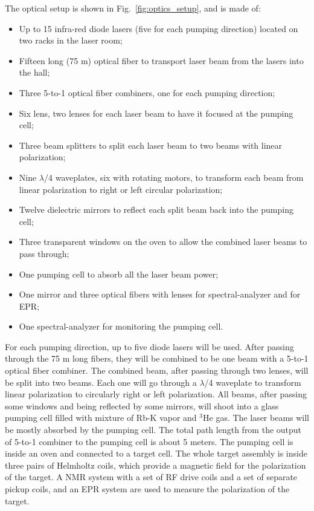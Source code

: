 {The optical setup is shown in Fig.~\ref{fig:optics_setup}, and is made of:
\begin {itemize}
\item Up to 15 infra-red diode lasers (five for each pumping direction) 
located on two racks in the laser room;
\item Fifteen long (75 m) optical fiber to transport laser beam from the lasers
into the hall;
\item Three 5-to-1 optical fiber combiners, one for each pumping direction;
\item Six lens, two lenses for each laser beam to have it focused at the 
pumping cell;
\item Three beam splitters to split each laser beam to two beams with linear polarization;
\item Nine $\lambda$/4 waveplates, six with rotating motors, to transform 
each beam from linear polarization to right or left circular polarization;
\item Twelve dielectric mirrors to reflect each split beam back into the pumping cell;
\item Three transparent windows 
on the oven to allow the combined laser beams to pass through;
\item One pumping cell to absorb all the laser beam power;
\item One mirror and three optical fibers with lenses for 
spectral-analyzer and for EPR;
\item One spectral-analyzer for monitoring the pumping cell.
\end {itemize}

For each pumping direction, up to five diode lasers will be used. 
After passing through the 75 m long fibers, they will be combined
to be one beam with a 5-to-1 optical fiber combiner. The combined beam, after passing through two lenses,
will be split into two beams. Each one will go through a $\lambda$/4 waveplate
to transform linear polarization to circularly right or left polarization. 
All beams, after passing some windows and being reflected by some mirrors,  
will shoot into a glass pumping cell filled with
mixture of Rb-K vapor and $^3$He gas. The laser beams will be mostly absorbed
by the pumping cell. The total path length from the output of 5-to-1 combiner 
to the pumping cell
is about 5 meters. The pumping cell is inside an oven and 
connected to a target cell. The whole target assembly is inside three pairs of
Helmholtz coils, which provide a magnetic field for the polarization of the
target. A NMR system with a set of RF drive coils and a set of separate 
pickup coils, and an EPR system 
are used to measure the polarization of the target.


}
